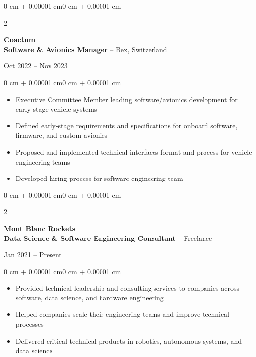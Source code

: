 \documentclass[10pt, letterpaper]{article}
\newenvironment{highlights}{
    \begin{itemize}[
        topsep=0.10 cm,
        parsep=0.10 cm,
        partopsep=0pt,
        itemsep=0pt,
        leftmargin=0 cm + 10pt
    ]
}{
    \end{itemize}
}
\newenvironment{onecolentry}{
    \begin{adjustwidth}{0 cm + 0.00001 cm}{0 cm + 0.00001 cm}
}{
    \end{adjustwidth}
}
\newenvironment{twocolentry}[2][]{
    \onecolentry
    \def\secondColumn{#2}
    \setcolumnwidth{\fill, 4.5 cm}
    \begin{paracol}{2}
}{
    \switchcolumn \raggedleft \secondColumn
    \end{paracol}
    \endonecolentry
}
\begin{document}
    \vspace{0.5cm}

    \begin{twocolentry}{Oct 2022 -- Nov 2023}
        \textbf{Coactum} \\
        \textbf{Software \& Avionics Manager} -- Bex, Switzerland
    \end{twocolentry}
    \begin{onecolentry}
        \begin{highlights}
            \item Executive Committee Member leading software/avionics development for early-stage vehicle systems
            \item Defined early-stage requirements and specifications for onboard software, firmware, and custom avionics
            \item Proposed and implemented technical interfaces format and process for vehicle engineering teams
            \item Developed hiring process for software engineering team
        \end{highlights}
    \end{onecolentry}

    \vspace{0.5cm}

    \begin{twocolentry}{Jan 2021 -- Present}
        \textbf{Mont Blanc Rockets} \\
        \textbf{Data Science \& Software Engineering Consultant} -- Freelance
    \end{twocolentry}
    \begin{onecolentry}
        \begin{highlights}
            \item Provided technical leadership and consulting services to companies across software, data science, and hardware engineering
            \item Helped companies scale their engineering teams and improve technical processes
            \item Delivered critical technical products in robotics, autonomous systems, and data science
        \end{highlights}
    \end{onecolentry}

    \vspace{0.5cm}
\end{document}
